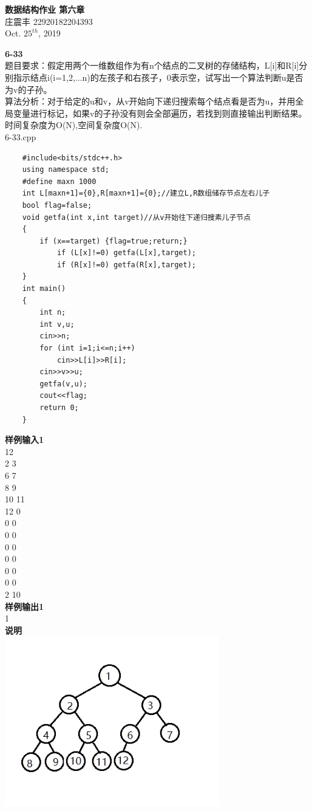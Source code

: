 \documentclass[UTF8,a4paper]{article}
\begin{document}
\begin{center}
    \textbf{\LARGE{数据结构作业 第六章}}\\[0.5cm]
    \normalsize{庄震丰 22920182204393}\\[0.3cm]
    \large{Oct. $25^{th}$, 2019}
\end{center}
\textbf{6-33}\\
    题目要求：假定用两个一维数组作为有n个结点的二叉树的存储结构，L[i]和R[i]分别指示结点i(i=1,2,...n)的左孩子和右孩子，0表示空，试写出一个算法判断u是否为v的子孙。\\
	算法分析：对于给定的u和v，从v开始向下递归搜索每个结点看是否为u，并用全局变量进行标记，如果v的子孙没有则会全部遍历，若找到则直接输出判断结果。
	\\
	时间复杂度为O(N),空间复杂度O(N).\\
	6-33.cpp
\begin{lstlisting}
	#include<bits/stdc++.h>
	using namespace std;
	#define maxn 1000
	int L[maxn+1]={0},R[maxn+1]={0};//建立L,R数组储存节点左右儿子
	bool flag=false;
	void getfa(int x,int target)//从v开始往下递归搜素儿子节点
	{
		if (x==target) {flag=true;return;}
			if (L[x]!=0) getfa(L[x],target);
			if (R[x]!=0) getfa(R[x],target);
	}
	int main()
	{
		int n;
		int v,u;
		cin>>n;
		for (int i=1;i<=n;i++)
			cin>>L[i]>>R[i];
		cin>>v>>u;
		getfa(v,u); 
		cout<<flag;
		return 0;
	}
\end{lstlisting}
\textbf{样例输入1}\\
12\\
2 3\\
6 7\\
8 9\\
10 11\\
12 0\\
0 0\\
0 0\\
0 0\\
0 0\\
0 0\\
0 0\\
2 10\\
\textbf{样例输出1}\\
1\\
\textbf{说明}\\
\includegraphics[width=0.7\textwidth]{6-33.png}\\
\end{document}
